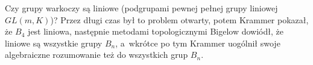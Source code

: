 Czy grupy warkoczy są liniowe (podgrupami pewnej pełnej grupy liniowej $GL(m, K)$)?
Przez długi czas był to problem otwarty, potem Krammer \cite{krammer2000} pokazał, że $B_4$ jest liniowa, następnie metodami topologicznymi Bigelow \cite{bigelow2001} dowiódł, że liniowe są wszystkie grupy $B_n$, a~wkrótce po tym Krammer \cite{krammer2002} uogólnił swoje algebraiczne rozumowanie też do wszystkich grup $B_n$.
%
%


